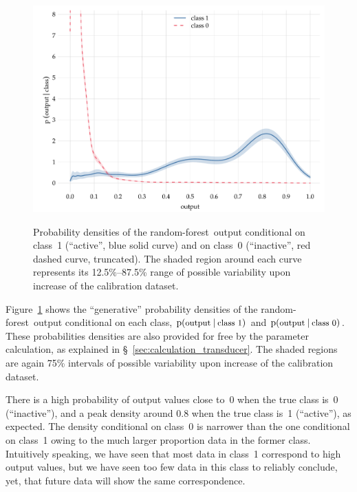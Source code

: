 \documentclass[\ifafour a4paper,12pt,\else a5paper,10pt,\fi%
onecolumn,oneside,article,%
british%
]{memoir}
\theoremstyle{remark}
\theoremstyle{innote}
\newcommand*{\p}{\mathrm{p}}%
\renewcommand*{\|}[1][]{\nonscript\:#1\vert\nonscript\:\mathopen{}}
\newcommand*{\sect}{\S}%
\newcommand*{\texts}[1]{\text{\small #1}}
\newcommand*{\RF}{random forest}
\newcommand*{\rf}{random-forest}
\begin{document}
\begin{figure}[t]
  \centering
  \includegraphics[width=\linewidth]{transducer_curve_RFraw2_inverse_trunc.pdf}\\
  \caption{Probability densities of the \rf\ output conditional on class~1 (\enquote{active}, \textcolor{mypurpleblue}{blue solid curve}) and on class~0 (\enquote{inactive}, \textcolor{myred}{red dashed curve}, truncated). The shaded region around each curve represents its 12.5\%--87.5\% range of possible variability upon increase of the calibration dataset.}
  \label{fig:prob_curve_RF_inverse}
\end{figure}
%
Figure~\ref{fig:prob_curve_RF_inverse} shows the \enquote{generative} probability densities of the \rf\ output conditional on each class, $\p(\texts{output} \| \texts{class 1})$ and $\p(\texts{output} \| \texts{class 0})$. These probabilities densities are also provided for free by the parameter calculation, as explained in \sect~\ref{sec:calculation_transducer}. The shaded regions are again 75\% intervals of possible variability upon increase of the calibration dataset.

There is a high probability of output values close to~0 when the true class is~0 (\enquote{inactive}), and a peak density around 0.8 when the true class is~1 (\enquote{active}), as expected. The density conditional on class~0 is narrower than the one conditional on class~1 owing to the much larger proportion data in the former class. Intuitively speaking, we have seen that most data in class~1 correspond to high output values, but we have seen too few data in this class to reliably conclude, yet, that future data will show the same correspondence. %
\end{document}
